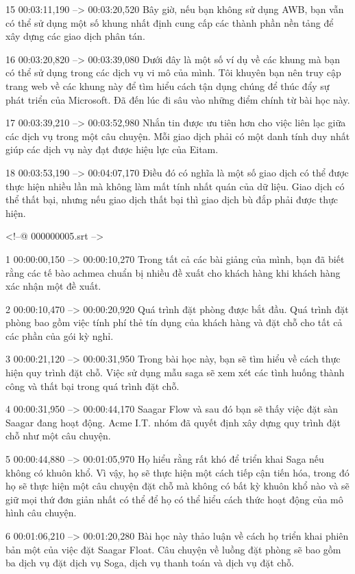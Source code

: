 15
00:03:11,190 --> 00:03:20,520
Bây giờ, nếu bạn không sử dụng AWB, bạn vẫn có thể sử dụng một số khung nhất định cung cấp các thành phần nền tảng để xây dựng các giao dịch phân tán.

16
00:03:20,820 --> 00:03:39,080
Dưới đây là một số ví dụ về các khung mà bạn có thể sử dụng trong các dịch vụ vi mô của mình.  Tôi khuyên bạn nên truy cập trang web về các khung này để tìm hiểu cách tận dụng chúng để thúc đẩy sự phát triển của Microsoft. Đã đến lúc đi sâu vào những điểm chính từ bài học này.

17
00:03:39,210 --> 00:03:52,980
Nhắn tin được ưu tiên hơn cho việc liên lạc giữa các dịch vụ trong một câu chuyện.  Mỗi giao dịch phải có một danh tính duy nhất giúp các dịch vụ này đạt được hiệu lực của Eitam.

18
00:03:53,190 --> 00:04:07,170
Điều đó có nghĩa là một số giao dịch có thể được thực hiện nhiều lần mà không làm mất tính nhất quán của dữ liệu.  Giao dịch có thể thất bại, nhưng nếu giao dịch thất bại thì giao dịch bù đắp phải được thực hiện.

<!--@ 000000005.srt -->

1
00:00:00,150 --> 00:00:10,270
Trong tất cả các bài giảng của mình, bạn đã biết rằng các tế bào achmea chuẩn bị nhiều đề xuất cho khách hàng khi khách hàng xác nhận một đề xuất.

2
00:00:10,470 --> 00:00:20,920
Quá trình đặt phòng được bắt đầu.  Quá trình đặt phòng bao gồm việc tính phí thẻ tín dụng của khách hàng và đặt chỗ cho tất cả các phần của gói kỳ nghỉ.

3
00:00:21,120 --> 00:00:31,950
Trong bài học này, bạn sẽ tìm hiểu về cách thực hiện quy trình đặt chỗ.  Việc sử dụng mẫu saga sẽ xem xét các tình huống thành công và thất bại trong quá trình đặt chỗ.

4
00:00:31,950 --> 00:00:44,170
Saagar Flow và sau đó bạn sẽ thấy việc đặt sàn Saagar đang hoạt động.  Acme I.T.  nhóm đã quyết định xây dựng quy trình đặt chỗ như một câu chuyện.

5
00:00:44,880 --> 00:01:05,970
Họ hiểu rằng rất khó để triển khai Saga nếu không có khuôn khổ.  Vì vậy, họ sẽ thực hiện một cách tiếp cận tiến hóa, trong đó họ sẽ thực hiện một câu chuyện đặt chỗ mà không có bất kỳ khuôn khổ nào và sẽ giữ mọi thứ đơn giản nhất có thể để họ có thể hiểu cách thức hoạt động của mô hình câu chuyện.

6
00:01:06,210 --> 00:01:20,280
Bài học này thảo luận về cách họ triển khai phiên bản một của việc đặt Saagar Float.  Câu chuyện về luồng đặt phòng sẽ bao gồm ba dịch vụ đặt dịch vụ Soga, dịch vụ thanh toán và dịch vụ đặt chỗ.

